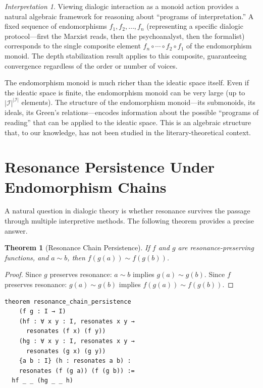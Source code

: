 \documentclass[11pt,openany]{book}
\theoremstyle{definition}
\theoremstyle{plain}
\newtheorem{theorem}[axiom]{Theorem}
\theoremstyle{remark}
\newtheorem{interpretation}[axiom]{Interpretation}
\newcommand{\IS}{\mathcal{I}}               %
\newcommand{\res}{\sim}                      %
\begin{document}
\begin{interpretation}
Viewing dialogic interaction as a monoid action provides a natural algebraic framework for reasoning about ``programs of interpretation.'' A fixed sequence of endomorphisms $f_1, f_2, \ldots, f_n$ (representing a specific dialogic protocol---first the Marxist reads, then the psychoanalyst, then the formalist) corresponds to the single composite element $f_n \circ \cdots \circ f_2 \circ f_1$ of the endomorphism monoid. The depth stabilization result applies to this composite, guaranteeing convergence regardless of the order or number of voices.

The endomorphism monoid is much richer than the ideatic space itself. Even if the ideatic space is finite, the endomorphism monoid can be very large (up to $|\IS|^{|\IS|}$ elements). The structure of the endomorphism monoid---its submonoids, its ideals, its Green's relations---encodes information about the possible ``programs of reading'' that can be applied to the ideatic space. This is an algebraic structure that, to our knowledge, has not been studied in the literary-theoretical context.
\end{interpretation}

\section{Resonance Persistence Under Endomorphism Chains}

A natural question in dialogic theory is whether resonance survives the passage through multiple interpretive methods. The following theorem provides a precise answer.

\begin{theorem}[Resonance Chain Persistence]
If $f$ and $g$ are resonance-preserving functions, and $a \res b$, then $f(g(a)) \res f(g(b))$.
\end{theorem}

\begin{proof}
Since $g$ preserves resonance: $a \res b$ implies $g(a) \res g(b)$. Since $f$ preserves resonance: $g(a) \res g(b)$ implies $f(g(a)) \res f(g(b))$.
\end{proof}

\begin{lstlisting}[language=Lean4]
theorem resonance_chain_persistence
    (f g : I → I)
    (hf : ∀ x y : I, resonates x y →
      resonates (f x) (f y))
    (hg : ∀ x y : I, resonates x y →
      resonates (g x) (g y))
    {a b : I} (h : resonates a b) :
    resonates (f (g a)) (f (g b)) :=
  hf _ _ (hg _ _ h)
\end{lstlisting}
\end{document}
